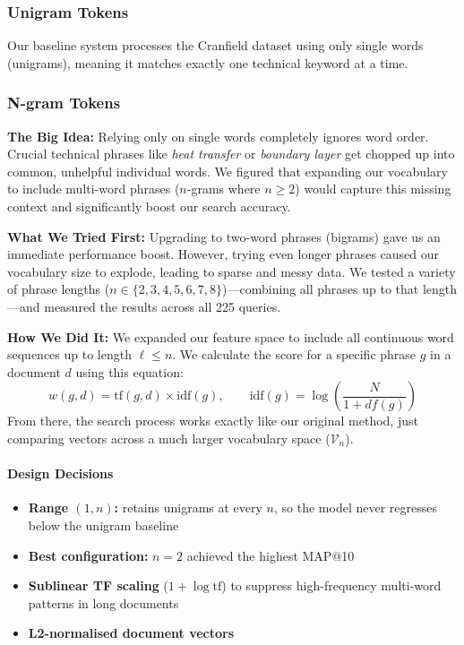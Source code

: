 \documentclass[runningheads]{llncs}
\begin{document}
\subsubsection{Unigram Tokens}
Our baseline system processes the Cranfield dataset using only single words (unigrams), meaning it matches exactly one technical keyword at a time.

\subsubsection{N-gram Tokens}

\textbf{The Big Idea:}
Relying only on single words completely ignores word order. Crucial technical phrases like \textit{heat transfer} or \textit{boundary layer} get chopped up into common, unhelpful individual words. We figured that expanding our vocabulary to include multi-word phrases ($n$-grams where $n \geq 2$) would capture this missing context and significantly boost our search accuracy.

\textbf{What We Tried First:}
Upgrading to two-word phrases (bigrams) gave us an immediate performance boost. However, trying even longer phrases caused our vocabulary size to explode, leading to sparse and messy data. We tested a variety of phrase lengths ($n \in \{2, 3, 4, 5, 6, 7, 8\}$)---combining all phrases up to that length---and measured the results across all 225 queries.

\textbf{How We Did It:}
We expanded our feature space to include all continuous word sequences up to length $\ell \leq n$. We calculate the score for a specific phrase $g$ in a document $d$ using this equation:
\begin{equation}
    w(g, d) = \text{tf}(g, d) \times \text{idf}(g),
    \qquad
    \text{idf}(g) = \log\!\left(\frac{N}{1 + df(g)}\right)
\end{equation}
From there, the search process works exactly like our original method, just comparing vectors across a much larger vocabulary space ($\mathcal{V}_n$).

\paragraph{Design Decisions}
\begin{itemize}[noitemsep]
    \item \textbf{Range $(1, n)$:} retains unigrams at every $n$, so the
      model never regresses below the unigram baseline
    \item \textbf{Best configuration:} $n = 2$ achieved the highest MAP@10
    \item \textbf{Sublinear TF scaling} ($1 + \log \text{tf}$) to suppress
      high-frequency multi-word patterns in long documents
    \item \textbf{L2-normalised document vectors}
\end{itemize}
\end{document}

